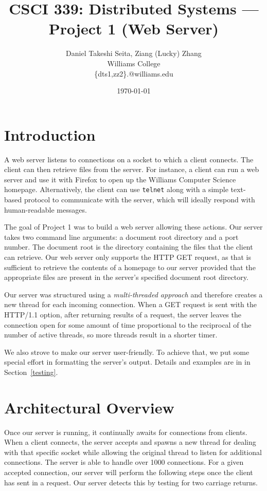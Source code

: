 \documentclass[letterpaper,11pt,twocolumn]{article}
\begin{document}
\title{CSCI 339: Distributed Systems --- Project 1 (Web Server)} 
\date{\today}
\author{
  {\rm Daniel Takeshi Seita, Ziang (Lucky) Zhang}\\
       Williams College\\
       \{dts1,zz2\}.@williams.edu
}
\maketitle
\thispagestyle{empty}

\section{Introduction}
A web server listens to connections on a socket to which a client connects. The client can then retrieve files from the server. For instance, a client
can run a web server and use it with Firefox to open up the Williams Computer Science homepage. Alternatively, the client can use \texttt{telnet}
along with  a simple text-based protocol to communicate with the server, which will ideally respond with human-readable messages.

The goal of Project 1 was to build a web server allowing these actions. Our server takes two command line arguments: a document root directory and a
port number. The document root is the directory containing the files that the client can retrieve. Our web server only supports the HTTP GET request,
as that is sufficient to retrieve the contents of a homepage to our server provided that the appropriate files are present in the server's specified
document root directory.

Our server was structured using a \emph{multi-threaded approach} and therefore creates a new thread for each incoming connection.  When a GET request
is sent with the HTTP/1.1 option, after returning results of a request, the server leaves the connection open for some amount of time proportional to
the reciprocal of the number of active threads, so more threads result in a shorter timer.

We also strove to make our server user-friendly. To achieve that, we put some special effort in formatting the server's output. Details and examples
are in in Section~\ref{testing}.

\section{Architectural Overview}

Once our server is running, it continually awaits for connections from clients. When a client connects, the server accepts and spawns a new thread for
dealing with that specific socket while allowing the original thread to listen for additional connections. The server is able to handle over 1000
connections. For a given accepted connection, our server will perform the following steps once the client has sent in a request. Our server detects
this by testing for two carriage returns.
\end{document}
